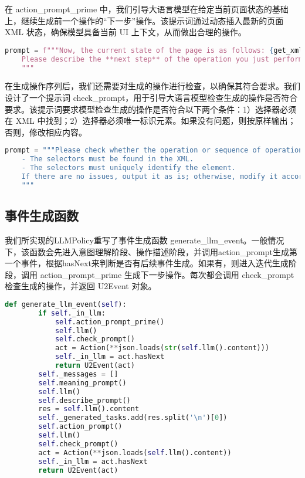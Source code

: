 \documentclass{article}
\begin{document}
在 action\_prompt\_prime 中，我们引导大语言模型在给定当前页面状态的基础上，继续生成前一个操作的“下一步”操作。该提示词通过动态插入最新的页面 XML 状态，确保模型具备当前 UI 上下文，从而做出合理的操作。

\begin{lstlisting}[language=python, caption=后续事件生成]
    prompt = f"""Now, the current state of the page is as follows: {get_xml(self.device.u2)}
    Please describe the **next step** of the operation you just performed in JSON format, using the same format as above.
    """
\end{lstlisting}

在生成操作序列后，我们还需要对生成的操作进行检查，以确保其符合要求。我们设计了一个提示词 check\_prompt，用于引导大语言模型检查生成的操作是否符合要求。该提示词要求模型检查生成的操作是否符合以下两个条件：1）选择器必须在 XML 中找到；2）选择器必须唯一标识元素。如果没有问题，则按原样输出；否则，修改相应内容。

\begin{lstlisting}[language=python, caption=操作检查]
    prompt = """Please check whether the operation or sequence of operations you just generated meets the requirements:
    - The selectors must be found in the XML.
    - The selectors must uniquely identify the element.
    If there are no issues, output it as is; otherwise, modify it accordingly.
    """
\end{lstlisting}

\subsection{事件生成函数}

我们所实现的LLMPolicy重写了事件生成函数 generate\_llm\_event。一般情况下，该函数会先进入意图理解阶段、操作描述阶段，并调用action\_prompt生成第一个事件，根据hasNext来判断是否有后续事件生成。如果有，则进入迭代生成阶段，调用 action\_prompt\_prime 生成下一步操作。每次都会调用 check\_prompt 检查生成的操作，并返回 U2Event 对象。

\begin{lstlisting}[language=python, caption=LLM事件生成]
    def generate_llm_event(self):
        if self._in_llm:
            self.action_prompt_prime()
            self.llm()
            self.check_prompt()
            act = Action(**json.loads(str(self.llm().content)))
            self._in_llm = act.hasNext
            return U2Event(act)
        self._messages = []
        self.meaning_prompt()
        self.llm()
        self.describe_prompt()
        res = self.llm().content
        self._generated_tasks.add(res.split('\n')[0])
        self.action_prompt()
        self.llm()
        self.check_prompt()
        act = Action(**json.loads(self.llm().content))
        self._in_llm = act.hasNext
        return U2Event(act)
\end{lstlisting}
\end{document}
